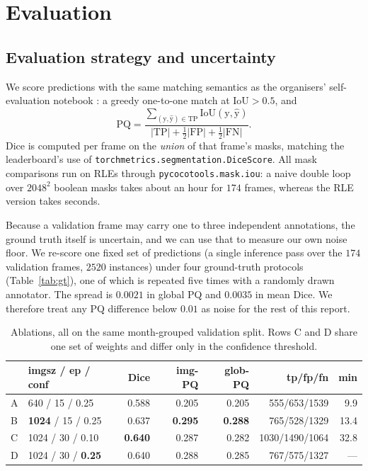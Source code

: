 \documentclass[sigconf]{acmart}
\providecommand{\Description}[1]{}
\begin{document}
\section{Evaluation}\label{sec:evaluation}

\subsection{Evaluation strategy and uncertainty}
We score predictions with the same matching semantics as the organisers' self-evaluation notebook \cite{pq}: a greedy one-to-one match at $\mathrm{IoU}>0.5$, and
\[
\mathrm{PQ}=\frac{\sum_{(\mathrm{y},\hat{\mathrm{y}})\in\mathrm{TP}}\mathrm{IoU}(\mathrm{y},\hat{\mathrm{y}})}{|\mathrm{TP}|+\tfrac12|\mathrm{FP}|+\tfrac12|\mathrm{FN}|}.
\]
Dice is computed per frame on the \emph{union} of that frame's masks, matching the leaderboard's use of \texttt{torchmetrics.segmentation.DiceScore}. All mask comparisons run on RLEs through \texttt{pycocotools.mask.iou}: a naive double loop over $2048^2$ boolean masks takes about an hour for $174$ frames, whereas the RLE version takes seconds.

Because a validation frame may carry one to three independent annotations, the ground truth itself is uncertain, and we can use that to measure our own noise floor. We re-score one fixed set of predictions (a single inference pass over the $174$ validation frames, $2520$ instances) under four ground-truth protocols (Table~\ref{tab:gt}), one of which is repeated five times with a randomly drawn annotator. The spread is $0.0021$ in global PQ and $0.0035$ in mean Dice. We therefore treat any PQ difference below $0.01$ as noise for the rest of this report.

\begin{table}[t]
\centering
\caption{Ablations, all on the same month-grouped validation split. Rows C and D share one set of weights and differ only in the confidence threshold.}
\Description{Table of four ablation runs with resolution, epochs, threshold, training time, and five metrics.}
\label{tab:ablation}
\small
\begin{tabular}{llrrrrr}
\hline
 & \textbf{imgsz} / ep / conf & \textbf{Dice} & \textbf{img-PQ} & \textbf{glob-PQ} & \textbf{tp/fp/fn} & \textbf{min} \\
\hline
A & 640 / 15 / 0.25 & 0.588 & 0.205 & 0.205 & 555/653/1539 & 9.9 \\
B & \textbf{1024} / 15 / 0.25 & 0.637 & \textbf{0.295} & \textbf{0.288} & 765/528/1329 & 13.4 \\
C & 1024 / 30 / 0.10 & \textbf{0.640} & 0.287 & 0.282 & 1030/1490/1064 & 32.8 \\
D & 1024 / 30 / \textbf{0.25} & 0.640 & 0.288 & 0.285 & 767/575/1327 & --- \\
\hline
\end{tabular}
\end{table}
\end{document}
